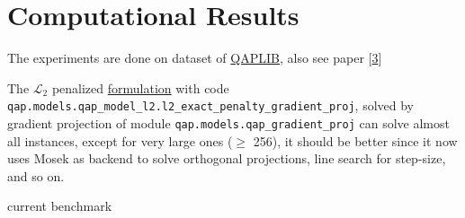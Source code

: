 \documentclass[
  10pt,
  a4paper,
,tablecaptionabove
]{scrartcl}
\begin{document}
\hypertarget{computational-results}{%
\section{Computational Results}\label{computational-results}}

The experiments are done on dataset of
\href{http://anjos.mgi.polymtl.ca/qaplib/}{QAPLIB}, also see paper
{[}\protect\hyperlink{ref-burkard1997qaplib}{3}{]}

The \(\mathscr L_2\) penalized
\protect\hyperlink{mathscr-l_2--mathscr-l_1-penalized-formulation}{formulation}
with code
\texttt{qap.models.qap\_model\_l2.l2\_exact\_penalty\_gradient\_proj},
solved by gradient projection of module
\texttt{qap.models.qap\_gradient\_proj} can solve almost all instances,
except for very large ones (\(\ge\) 256), it should be better since it
now uses Mosek as backend to solve orthogonal projections, line search
for step-size, and so on.

current benchmark
\end{document}
